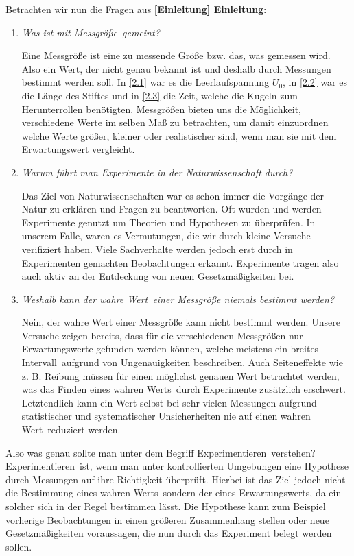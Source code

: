 \documentclass[11pt,a4paper,titlepage, ngerman]{article}
\begin{document}
		Betrachten wir nun die Fragen aus \textbf{\ref{Einleitung} Einleitung}: 
		\begin{enumerate}
			\item \textit{Was ist mit \glqq Messgröße\grqq\ gemeint?} 
				\vspace{0.2cm}
				
				Eine Messgröße ist eine zu messende Größe bzw. das, was gemessen wird.
				Also ein Wert, der nicht genau bekannt ist und deshalb durch Messungen bestimmt werden soll.
				In \ref{2.1} war es die Leerlaufspannung $U_0$, in \ref{2.2} war es die Länge des Stiftes und in \ref{2.3} die Zeit, welche die Kugeln zum Herunterrollen benötigten.
				Messgrößen bieten uns die Möglichkeit, verschiedene Werte im selben Maß zu betrachten, um damit einzuordnen welche Werte größer, kleiner oder realistischer sind, wenn man sie mit dem Erwartungswert vergleicht. 			
			\item \textit{Warum führt man Experimente in der Naturwissenschaft durch?}
				\vspace{0.2cm}
				
				Das Ziel von Naturwissenschaften war es schon immer die Vorgänge der Natur zu erklären und Fragen zu beantworten. 
				Oft wurden und werden Experimente genutzt um Theorien und Hypothesen zu überprüfen. In unserem Falle, waren es Vermutungen, die wir durch kleine Versuche verifiziert haben.			
				Viele Sachverhalte werden jedoch erst durch in Experimenten gemachten Beobachtungen erkannt.
				Experimente tragen also auch aktiv an der Entdeckung von neuen Gesetzmäßigkeiten bei.	 
			\item \textit{Weshalb kann der \glqq wahre Wert\grqq\ einer Messgröße niemals bestimmt werden?}
				\vspace{0.2cm}
				
				Nein, der wahre Wert einer Messgröße kann nicht bestimmt werden. Unsere Versuche zeigen bereits, dass für die verschiedenen Messgrößen nur Erwartungswerte gefunden werden können, welche meistens ein \glqq breites Intervall\grqq\ aufgrund von Ungenauigkeiten beschreiben.
				Auch Seiteneffekte wie z. B. Reibung müssen für einen möglichst genauen Wert betrachtet werden, was das Finden eines \glqq wahren Werts\grqq\ durch Experimente zusätzlich erschwert.		
				Letztendlich kann ein Wert selbst bei sehr vielen Messungen aufgrund statistischer und systematischer Unsicherheiten nie auf einen \glqq wahren Wert\grqq\ reduziert werden.	
		\end{enumerate}
		Also was genau sollte man unter dem Begriff \glqq Experimentieren\grqq\ verstehen? 
		\glqq Experimentieren\grqq\ ist, wenn man unter kontrollierten Umgebungen eine Hypothese durch Messungen auf ihre Richtigkeit überprüft.	
		Hierbei ist das Ziel jedoch nicht die Bestimmung eines \glqq wahren Werts\grqq\, sondern der eines Erwartungswerts, da ein solcher sich in der Regel bestimmen lässt.
		Die Hypothese kann zum Beispiel vorherige Beobachtungen in einen größeren Zusammenhang stellen oder neue Gesetzmäßigkeiten voraussagen, die nun durch das Experiment belegt werden sollen.
		
\end{document}
